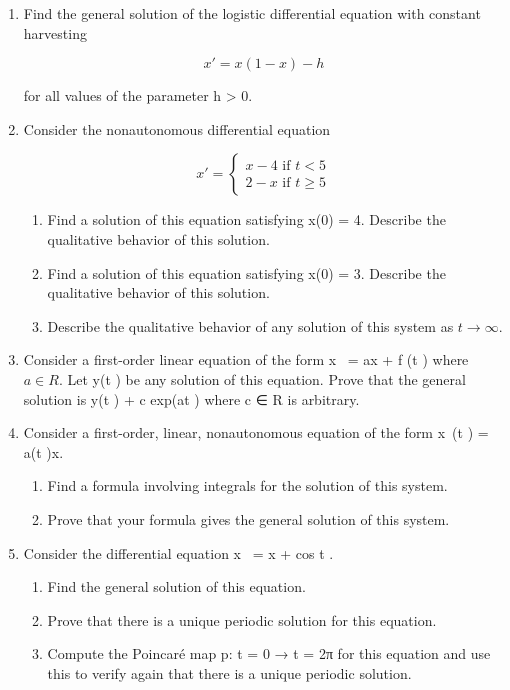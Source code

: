 \documentclass{article}
\begin{document}
\begin{enumerate}
\item Find the general solution of the logistic differential equation with
constant harvesting

\[
x'  = x(1 - x) - h
\]

for all values of the parameter h > 0.

\item Consider the nonautonomous differential equation

\[
 x'=\left\{\begin{matrix}
x-4 \text{ if } t<5 \\
2-x \text{ if } t \geq 5
\end{matrix}\right.
\]

\begin{enumerate}
\item Find a solution of this equation satisfying x(0) = 4. Describe the
qualitative behavior of this solution.
\item Find a solution of this equation satisfying x(0) = 3. Describe the
qualitative behavior of this solution.
\item Describe the qualitative behavior of any solution of this system as
$t \to \infty$.
\end{enumerate}

\item Consider a first-order linear equation of the form x  = ax + f (t ) where
$a \in R$. Let y(t ) be any solution of this equation. Prove that the general
solution is y(t ) + c exp(at ) where c ∈ R is arbitrary.

\item Consider a first-order, linear, nonautonomous equation of the form
x (t ) = a(t )x.

\begin{enumerate}
\item Find a formula involving integrals for the solution of this system.
\item Prove that your formula gives the general solution of this system.
\end{enumerate}

\item Consider the differential equation x  = x + cos t .

\begin{enumerate}
\item Find the general solution of this equation.
\item Prove that there is a unique periodic solution for this equation.
\item Compute the Poincaré map p: {t = 0} → {t = 2π} for this equation
and use this to verify again that there is a unique periodic
solution.
\end{enumerate}


\end{enumerate}
\end{document}
